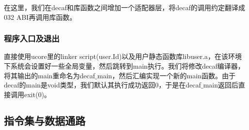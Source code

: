在这里，我们在decaf和库函数之间增加一个适配器层，将decaf的调用约定翻译成032 ABI再调用库函数。
\subsubsection{程序入口及退出}
直接使用ucore里的linker script(user.Id)以及用户静态函数库libuser.a，在该环境下系统会设置好一些全局变量，然后跳转到main执行。我们将修改decaf编译器，将其输出的main重命名为decaf$\_$main，然后汇编实现一个新的main函数。由于decaf的main是void类型，我们默认其执行成功返回0，于是在decaf$\_$main返回后直接调用exit(0)。
\subsection{指令集与数据通路}
